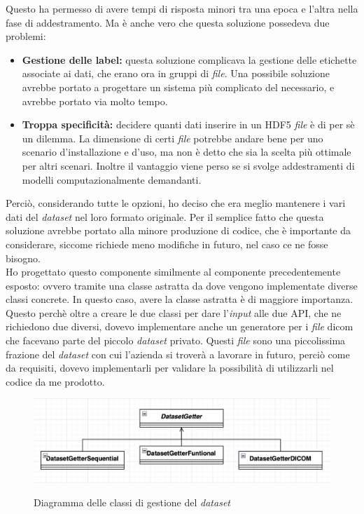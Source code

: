 Questo ha permesso di avere tempi di risposta minori tra una epoca e l'altra nella fase di addestramento.
Ma è anche vero che questa soluzione possedeva due problemi:
\begin{itemize}
    \item \textbf{Gestione delle \gls{label}:} questa soluzione complicava la gestione delle etichette associate ai dati, che erano ora in gruppi di \textit{file}. Una possibile soluzione avrebbe portato a progettare un sistema più complicato del necessario, e avrebbe portato via molto tempo.
    \item \textbf{Troppa specificità:} decidere quanti dati inserire in un HDF5 \textit{file} è di per sè un dilemma. La dimensione di certi \textit{file} potrebbe andare bene per uno scenario d'installazione e d'uso, ma non è detto che sia la scelta più ottimale per altri scenari. Inoltre il vantaggio viene perso se si svolge addestramenti di modelli computazionalmente demandanti.
\end{itemize}
Perciò, considerando tutte le opzioni, ho deciso che era meglio mantenere i vari dati del \textit{dataset} nel loro formato originale. Per il semplice fatto che questa soluzione avrebbe portato alla minore produzione di codice, che è importante da considerare, siccome richiede meno modifiche in futuro, nel caso ce ne fosse bisogno.\\
Ho progettato questo componente similmente al componente precedentemente esposto: ovvero tramite una classe astratta da dove vengono implementate diverse classi concrete.
In questo caso, avere la classe astratta è di maggiore importanza. Questo perchè oltre a creare le due classi per dare l'\textit{input} alle due API, che ne richiedono due diversi, dovevo implementare anche un generatore per i \textit{file} \gls{dicom} che facevano parte del piccolo \textit{dataset} privato.
Questi \textit{file} sono una piccolissima frazione del \textit{dataset} con cui l'azienda si troverà a lavorare in futuro, perciò come da requisiti, dovevo implementarli per validare la possibilità di utilizzarli nel codice da me prodotto.
\begin{figure}[H]
    \centering
    \includegraphics[alt={Diagramma delle classi di gestione del \textit{dataset}}, width=0.9\columnwidth]{img/dg-diag.png}
    \caption{\centering Diagramma delle classi di gestione del \textit{dataset}}
    \label{fig:datasetgetter-diagram}
\end{figure}

